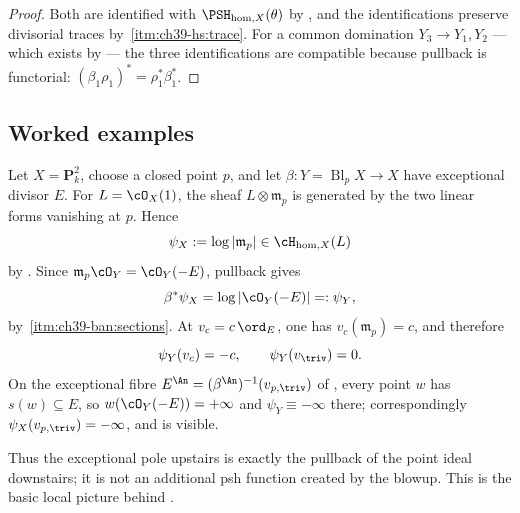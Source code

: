 \begin{proof}
Both are identified with $\PSH_{\mathrm{hom},X}(\theta)$ by
, and the identifications preserve
divisorial traces by
\,\cref{itm:ch39-hs:trace}.  For a common
domination $Y_3\to Y_1,Y_2$ --- which exists by
 --- the three identifications are
compatible because pullback is functorial:
$(\beta_1\rho_1)^*=\rho_1^*\beta_1^*$.
\end{proof}

\subsection{Worked examples}
\label{sec:ch39-homogeneous-examples}

\begin{example}
\label{ex:ch39-blowup-point}
Let $X=\mathbf P^2_k$, choose a closed point $p$, and let
$\beta:Y=\operatorname{Bl}_pX\to X$ have exceptional divisor $E$.
For $L=\cO_X(1)$, the sheaf $L\otimes\mathfrak m_p$ is generated by the
two linear forms vanishing at $p$.  Hence
\[
             \psi_X:=\log|\mathfrak m_p|
             \in\cH_{\mathrm{hom},X}(L)
\]
by .  Since
$\mathfrak m_p\cO_Y=\cO_Y(-E)$, pullback gives
\[
       \beta^*\psi_X
          =\log|\cO_Y(-E)|=:\psi_Y,
\]
by \,\cref{itm:ch39-ban:sections}.
At $v_c=c\,\ord_E$, one has $v_c(\mathfrak m_p)=c$, and therefore
\[
                  \psi_Y(v_c)=-c,
       \qquad \psi_Y(v_{\triv})=0.
\]
On the exceptional fibre $E^{\An}=(\beta^{\An})^{-1}(v_{p,\triv})$ of
, every point $w$ has $s(w)\subseteq E$, so
$w(\cO_Y(-E))=+\infty$ and $\psi_Y\equiv-\infty$ there; correspondingly
$\psi_X(v_{p,\triv})=-\infty$, and  is
visible.

Thus the exceptional pole upstairs is exactly the pullback of the point
ideal downstairs; it is not an additional psh function created by the
blowup.  This is the basic local picture behind
.
\end{example}

